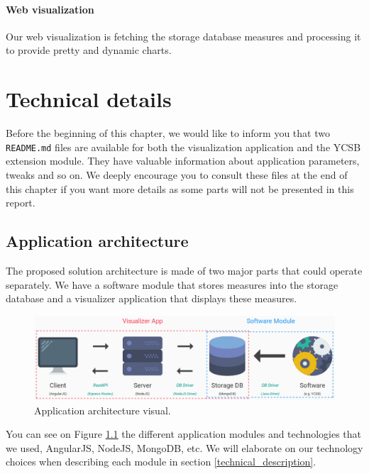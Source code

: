 \documentclass[a4paper,11pt]{report}
\begin{document}
\subsubsection{Web visualization}

Our web visualization is fetching the storage database measures and processing it to provide pretty and dynamic charts.

\clearpage

\chapter{Technical details}\label{techical_chapter}

Before the beginning of this chapter, we would like to inform you that two \texttt{README.md} files are available for both the visualization application and the YCSB extension module. They have valuable information about application parameters, tweaks and so on. We deeply encourage you to consult these files at the end of this chapter if you want more details as some parts will not be presented in this report.

\section{Application architecture}\label{app_archi_section}

The proposed solution architecture is made of two major parts that could operate separately. We have a software module that stores measures into the storage database and a visualizer application that displays these measures.

\begin{figure}[ht]
\begin{center}
\includegraphics[width=1\linewidth]{images/archi_small_complete.png}
\caption{Application architecture visual.}
\label{app_archi_fig}
\end{center}
\end{figure}

You can see on Figure \ref{app_archi_fig} the different application modules and technologies that we used, AngularJS, NodeJS, MongoDB, etc. We will elaborate on our technology choices when describing each module in section \ref{technical_description}. 
\end{document}
